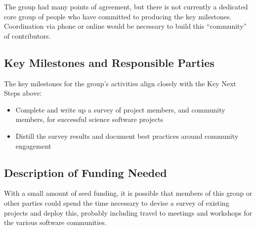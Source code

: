 The group had many points of agreement, but there is not currently a dedicated core group
of people who have committed to producing the key milestones. Coordination via phone or
online would be necessary to build this ``community'' of contributors.

\subsection{Key Milestones and Responsible Parties}

The key milestones for the group's activities align closely with the Key Next Steps above:

\begin{itemize}
\item Complete and write up a survey of project members, and community members, for successful science software projects
\item Distill the survey results and document best practices around community engagement
\end{itemize}


\subsection{Description of Funding Needed}

With a small amount of seed funding, it is possible that members of this group or other parties could
spend the time necessary to devise a survey of existing projects and deploy this, probably including travel to
meetings and workshops for the various software communities.
